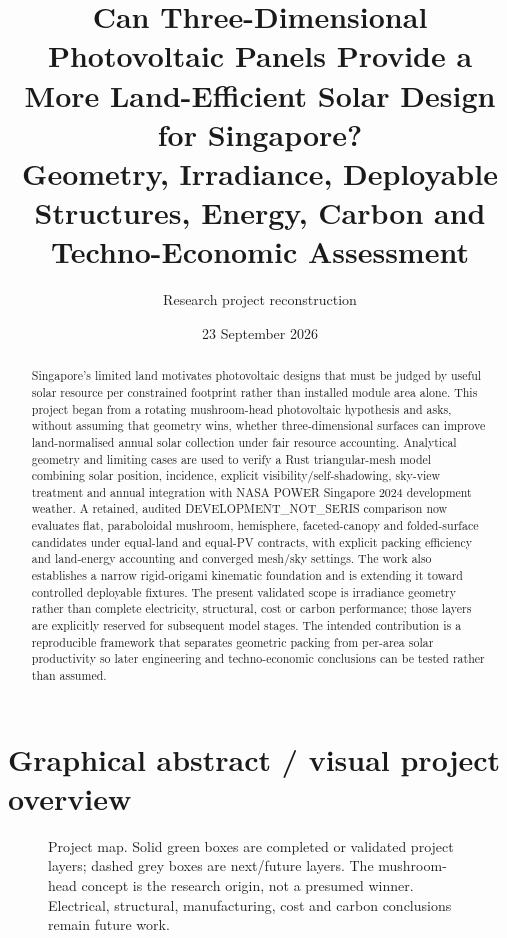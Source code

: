 \documentclass[11pt,a4paper]{article}
\title{Can Three-Dimensional Photovoltaic Panels Provide a More Land-Efficient Solar Design for Singapore?\\Geometry, Irradiance, Deployable Structures, Energy, Carbon and Techno-Economic Assessment}
\author{Research project reconstruction}
\date{23 September 2026}
\begin{document}
\maketitle
\begin{abstract}
Singapore's limited land motivates photovoltaic designs that must be judged by useful solar resource per constrained footprint rather than installed module area alone. This project began from a rotating mushroom-head photovoltaic hypothesis and asks, without assuming that geometry wins, whether three-dimensional surfaces can improve land-normalised annual solar collection under fair resource accounting. Analytical geometry and limiting cases are used to verify a Rust triangular-mesh model combining solar position, incidence, explicit visibility/self-shadowing, sky-view treatment and annual integration with NASA POWER Singapore 2024 development weather. A retained, audited DEVELOPMENT\_NOT\_SERIS comparison now evaluates flat, paraboloidal mushroom, hemisphere, faceted-canopy and folded-surface candidates under equal-land and equal-PV contracts, with explicit packing efficiency and land-energy accounting and converged mesh/sky settings. The work also establishes a narrow rigid-origami kinematic foundation and is extending it toward controlled deployable fixtures. The present validated scope is irradiance geometry rather than complete electricity, structural, cost or carbon performance; those layers are explicitly reserved for subsequent model stages. The intended contribution is a reproducible framework that separates geometric packing from per-area solar productivity so later engineering and techno-economic conclusions can be tested rather than assumed.
\end{abstract}

\section*{Graphical abstract / visual project overview}
\begin{figure}[H]\centering

\caption{Project map. Solid green boxes are completed or validated project layers; dashed grey boxes are next/future layers. The mushroom-head concept is the research origin, not a presumed winner. Electrical, structural, manufacturing, cost and carbon conclusions remain future work.}
\end{figure}

\tableofcontents
\clearpage
\end{document}
